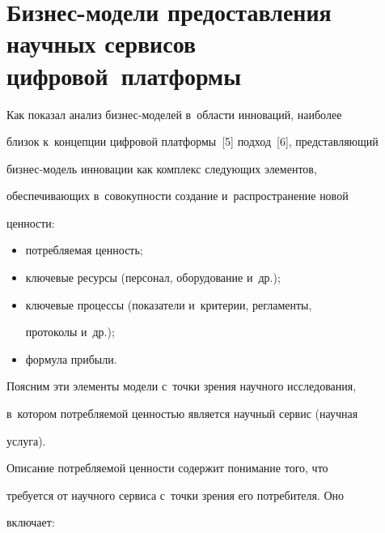      


\section{Бизнес-модели предоставления научных сервисов цифровой~платформы}





     Как показал анализ биз\-нес-мо\-де\-лей в~области инноваций, наиболее 


близок к~концепции цифровой платформы~[5] подход~[6], представляющий  


биз\-нес-мо\-дель инновации как комплекс следующих элементов, 


обеспечивающих в~совокупности создание и~распространение новой 


ценности:


     \begin{itemize}


\item потребляемая ценность;\\[-13.5pt]


     \item  ключевые ресурсы (персонал, оборудование и~др.);\\[-13.5pt]


     \item  ключевые процессы (показатели и~критерии, регламенты, 


протоколы и~др.);\\[-13.5pt]


     \item формула прибыли.


     \end{itemize}


     


     Поясним эти элементы модели с~точки зрения научного исследования, 


в~котором потребляемой ценностью является научный сервис (научная 


услуга). 


     


     Описание потребляемой ценности содержит понимание того, что 


требуется от научного сервиса с~точки зрения его потребителя. Оно 


включает:


